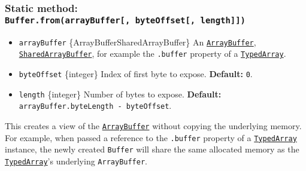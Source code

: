 \subsubsection{\texorpdfstring{Static method:
\texttt{Buffer.from(arrayBuffer{[},\ byteOffset{[},\ length{]}{]})}}{Static method: Buffer.from(arrayBuffer{[}, byteOffset{[}, length{]}{]})}}\label{static-method-buffer.fromarraybuffer-byteoffset-length}

\begin{itemize}
\tightlist
\item
  \texttt{arrayBuffer} \{ArrayBuffer\textbar SharedArrayBuffer\} An
  \href{https://developer.mozilla.org/en-US/docs/Web/JavaScript/Reference/Global_Objects/ArrayBuffer}{\texttt{ArrayBuffer}},
  \href{https://developer.mozilla.org/en-US/docs/Web/JavaScript/Reference/Global_Objects/SharedArrayBuffer}{\texttt{SharedArrayBuffer}},
  for example the \texttt{.buffer} property of a
  \href{https://developer.mozilla.org/en-US/docs/Web/JavaScript/Reference/Global_Objects/TypedArray}{\texttt{TypedArray}}.
\item
  \texttt{byteOffset} \{integer\} Index of first byte to expose.
  \textbf{Default:} \texttt{0}.
\item
  \texttt{length} \{integer\} Number of bytes to expose.
  \textbf{Default:} \texttt{arrayBuffer.byteLength\ -\ byteOffset}.
\end{itemize}

This creates a view of the
\href{https://developer.mozilla.org/en-US/docs/Web/JavaScript/Reference/Global_Objects/ArrayBuffer}{\texttt{ArrayBuffer}}
without copying the underlying memory. For example, when passed a
reference to the \texttt{.buffer} property of a
\href{https://developer.mozilla.org/en-US/docs/Web/JavaScript/Reference/Global_Objects/TypedArray}{\texttt{TypedArray}}
instance, the newly created \texttt{Buffer} will share the same
allocated memory as the
\href{https://developer.mozilla.org/en-US/docs/Web/JavaScript/Reference/Global_Objects/TypedArray}{\texttt{TypedArray}}'s
underlying \texttt{ArrayBuffer}.

